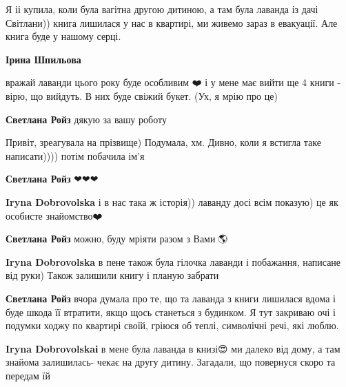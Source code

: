  
 
 
 
 

\qqSecCmt


Я іі купила, коли була вагітна другою дитиною, а там була лаванда із дачі
Світлани)) книга лишилася у нас в квартирі, ми живемо зараз в евакуації. Але
книга буде у нашому серці.

\begin{itemize} %
\textbf{Ірина Шпильова} 

вражай лаванди цього року буде особливим ❤️ і у мене має вийти ще 4 книги -
вірю, що вийдуть. В них буде свіжий букет. (Ух, я мрію про це)

\textbf{Светлана Ройз} дякую за вашу роботу

Привіт, зреагувала на прізвище) Подумала, хм. Дивно, коли я встигла таке написати)))) потім побачила ім'я

\textbf{Светлана Ройз} ❤❤❤🙏

\textbf{Iryna Dobrovolska} і в нас така ж історія)) лаванду досі всім показую) це як особисте знайомство❤️

\textbf{Светлана Ройз} можно, буду мріяти разом з Вами🤗🌎

\textbf{Iryna Dobrovolska} в пене також була гілочка лаванди і побажання, написане від руки)
Також залишили книгу і планую забрати

\textbf{Светлана Ройз} вчора думала про те, що та лаванда з книги лишилася вдома і буде шкода її втратити, якщо щось станеться з будинком. Я тут закриваю очі і подумки ходжу по квартирі своїй, гріюся об теплі, символічні речі, які люблю.

\textbf{Iryna Dobrovolskaі} в мене була лаванда в книзі😍 ми далеко від дому, а там знайома залишилась- чекає на другу дитину. Загадали, що повернуся скоро та передам їй🙏

\end{itemize} %

